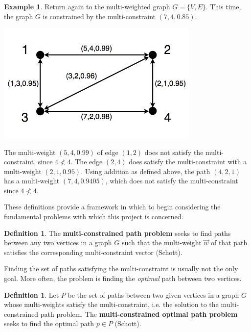 \documentclass[12pt]{amsart}
\theoremstyle{definition}
\newtheorem{definition}[thm]{Definition}
\newtheorem{example}[thm]{Example}
\theoremstyle{remark}
\numberwithin{equation}{section}
\begin{document}
\begin{example}
Return again to the multi-weighted graph $G = \{V,E\}$. This time, the graph $G$ is constrained by the multi-constraint $(7,4,0.85)$.

\begin{center}\includegraphics[width=10cm]{figure-4-5-6.png}\end{center}

The multi-weight $(5, 4, 0.99)$ of edge $(1,2)$ does not satisfy the multi-constraint, since $4 \not< 4$. The edge $(2,4)$ does satisfy the multi-constraint with a multi-weight $(2,1,0.95)$. Using addition as defined above, the path $(4,2,1)$ has a multi-weight $(7, 4, 0.9405)$, which does not satisfy the multi-constraint since $4 \not< 4$.
\end{example}

These definitions provide a framework in which to begin considering the fundamental problems with which this project is concerned.

\begin{definition}
The \textbf{multi-constrained path problem} seeks to find paths between any two vertices in a graph $G$ such that the multi-weight $\vec{w}$ of that path satisfies the corresponding multi-constraint vector (Schott). %
\end{definition}

Finding the set of paths satisfying the multi-constraint is usually not the only goal. More often, the problem is finding the \textit{optimal} path between two vertices.

\begin{definition}
Let $P$ be the set of paths between two given vertices in a graph $G$ whose multi-weights satisfy the multi-constraint, i.e. the solution to the multi-constrained path problem. The \textbf{multi-constrained optimal path problem} seeks to find the optimal path $p \in P$ (Schott).
\end{definition}
\end{document}
